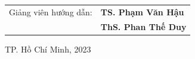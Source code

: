 \begin{titlepage}
    
    \vspace*{55pt}
    \begin{center}
        \begin{tabular}{cl}
            Giảng viên hướng dẫn: & \textbf{TS. Phạm Văn Hậu}  \\
                                  & \textbf{ThS. Phan Thế Duy}
        \end{tabular}
    \end{center}
    
    \vspace*{55pt}
    \begin{center}
        {\footnotesize TP. Hồ Chí Minh, 2023}
    \end{center}
\end{titlepage}
